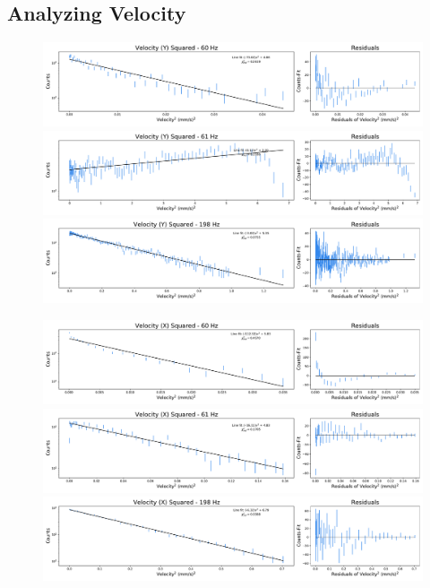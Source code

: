 \documentclass[12pt]{article}
\begin{document}
\subsection{Analyzing Velocity}
\begin{figure}[ht]
\centering
    \includegraphics[width=\textwidth]{data_01_y_vel.pdf}
	\caption{}
    \label{fig:01_y_vel}
    \includegraphics[width=\textwidth]{data_03_y_vel.pdf}
	\caption{}
    \label{fig:03_y_vel}
    \includegraphics[width=\textwidth]{data_04_y_vel.pdf}
	\caption{}
    \label{fig:04_y_vel}
\end{figure}


\begin{figure}[ht]
\centering
    \includegraphics[width=\textwidth]{data_01_x_vel.pdf}
	\caption{}
    \label{fig:01_x_vel}
    \includegraphics[width=\textwidth]{data_03_x_vel.pdf}
	\caption{}
    \label{fig:03_x_vel}
    \includegraphics[width=\textwidth]{data_04_x_vel.pdf}
	\caption{}
    \label{fig:04_x_vel}
\end{figure}
\end{document}
